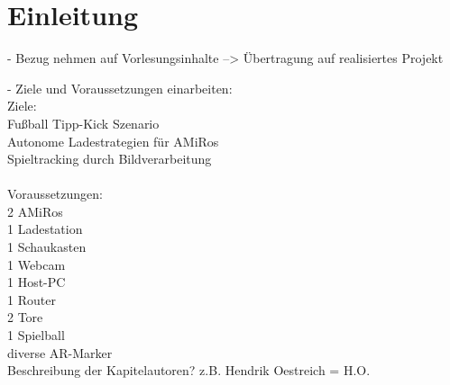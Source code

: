 \chapter[Einleitung]{Einleitung \hfill{}} \label{kap:einleitung} %
- Bezug nehmen auf Vorlesungsinhalte --> Übertragung auf realisiertes Projekt

- Ziele und Voraussetzungen einarbeiten:\\
Ziele:\\
Fußball Tipp-Kick Szenario \\
Autonome Ladestrategien für AMiRos\\
Spieltracking durch Bildverarbeitung\\
\\
Voraussetzungen:\\
2 AMiRos\\
1 Ladestation\\
1 Schaukasten\\
1 Webcam\\
1 Host-PC\\
1 Router\\
2 Tore\\
1 Spielball\\
diverse AR-Marker\\

Beschreibung der Kapitelautoren?
z.B. Hendrik Oestreich = H.O.